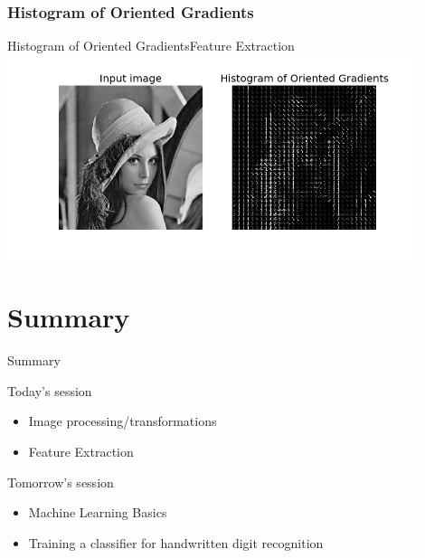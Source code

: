 \documentclass{beamer}
\begin{document}
\subsubsection{Histogram of Oriented Gradients}
\begin{frame}{Histogram of Oriented Gradients}{Feature Extraction}
\centering
    \includegraphics[width=120mm]{images/hog.png}

\end{frame}



\section*{Summary}
\begin{frame}{Summary}

\begin{block}{Today's session}
\begin{itemize}
\item Image processing/transformations
\item Feature Extraction
\end{itemize}
\end{block}

\begin{block}{Tomorrow's session}
\begin{itemize}
\item Machine Learning Basics
\item Training a classifier for handwritten digit recognition
\end{itemize}
\end{block}




\end{frame}
\end{document}
